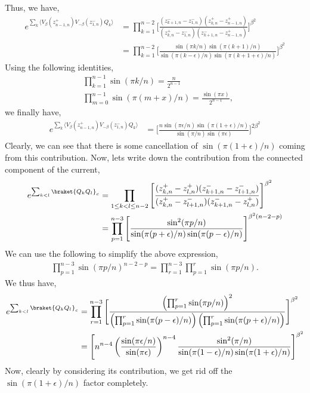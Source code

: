 \documentclass[11pt]{article}
\newcommand{\ep}{\epsilon}
\newcommand{\lb}{\left(}
\newcommand{\rb}{\right)}
\begin{document}
Thus, we have,
\begin{align}
    e^{\sum_k\langle V_\beta(z_{n-1,n}^+)V_{-\beta}(z_{1,n}^-)Q_k \rangle} &= \prod_{k=1}^{n-2} \Bigg[ \frac{(z_{k+1,n}^- - z_{1,n}^-)(z_{k,n}^+ - z_{n-1,n}^+)}{(z_{k,n}^+ - z_{1,n}^-)(z_{k+1,n}^- - z_{n-1,n}^+)}\Bigg]^{\beta^2} \\
    &=\prod_{k=1}^{n-2} \Bigg[ \frac{\sin(\pi k /n) \sin(\pi (k+1)/n)}{\sin(\pi(k-\ep)/n)\sin(\pi(k+1+\ep)/n)}\Bigg]^{\beta^2}
\end{align}
Using the following identities,
\begin{align}
    &\prod_{k=1}^{n-1} \sin(\pi k/n) = \frac{n}{2^{n-1}}\\
    &\prod_{m=0}^{n-1}\sin(\pi(m+x)/n)= \frac{\sin(\pi x)}{2^{n-1}},
\end{align}
we finally have,
\begin{align}
    e^{\sum_k\langle V_\beta(z_{n-1,n}^+)V_{-\beta}(z_{1,n}^-)Q_k \rangle} &= \Bigg[ \frac{n\sin(\pi \ep/n) \sin(\pi(1+\ep)/n)}{\sin(\pi/n)\sin(\pi \ep)} \Bigg]^{2\beta^2}
\end{align}
Clearly, we can see that there is some cancellation of $\sin(\pi(1+\ep)/n)$ coming from this contribution. Now, lets write down the contribution from the connected component of the current,
\begin{align}
    e^{\sum_{k<l}\braket{Q_kQ_l}_c} &= \prod_{1\leq k < l \leq n-2} \Bigg[\frac{(z_{k,n}^+ - z_{l,n}^+)(z_{k+1,n}^- - z_{l+1,n}^-)}{(z_{k,n}^+ - z_{l+1,n}^-)(z_{k+1,n}^- - z_{l,n}^+)}\Bigg]^{\beta^2} \\
    &= \prod_{p=1}^{n-3} \Bigg[\frac{\sin^2(\pi p/n)}{\sin(\pi(p+\ep)/n)\sin(\pi(p-\ep)/n)}\Bigg]^{\beta^2(n-2-p)}
\end{align}
We can use the following to simplify the above expression,
\begin{align}
    \prod_{p=1}^{n-3}\sin(\pi p/n)^{n-2-p} = \prod_{r=1}^{n-3}\prod_{p=1}^{r}\sin(\pi p/n).
\end{align}
We thus have,
\begin{align}
    e^{\sum_{k<l}\braket{Q_kQ_l}_c} &= \prod_{r=1}^{n-3}\Bigg[\frac{\lb\prod_{p=1}^r \sin(\pi p/n) \rb^2}{\lb \prod_{p=1}^r \sin(\pi (p-\ep)/n)  \rb\lb\prod_{p=1}^r \sin(\pi (p+\ep)/n)\rb}\Bigg]^{\beta^2} \\
    &= \Bigg[ n^{n-4 }\lb \frac{\sin(\pi \ep/n)}{\sin (\pi \ep)}\rb^{n-4}\frac{\sin^2(\pi/n)}{\sin(\pi(1-\ep)/n)\sin(\pi(1+\ep)/n)}\Bigg]^{\beta^2}
\end{align}
Now, clearly by considering its contribution, we get rid off the $\sin(\pi (1+\ep)/n)$ factor completely. 
\end{document}
